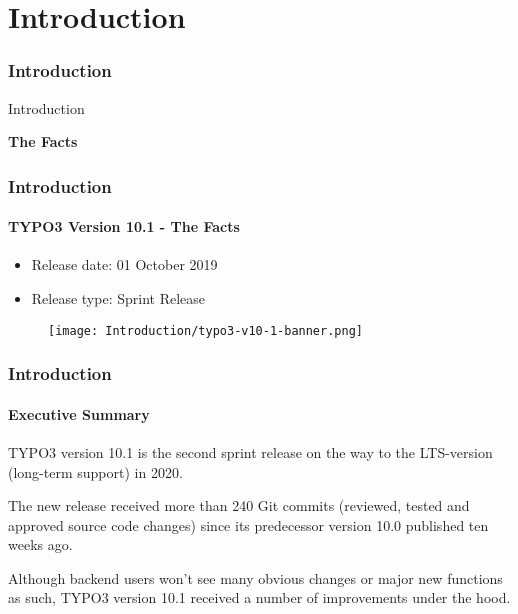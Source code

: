%

\section{Introduction}
\begin{frame}[fragile]
	\frametitle{Introduction}

	\begin{center}\huge{Introduction}\end{center}
	\begin{center}\huge{\color{typo3darkgrey}\textbf{The Facts}}\end{center}

\end{frame}


\begin{frame}[fragile]
	\frametitle{Introduction}
	\framesubtitle{TYPO3 Version 10.1 - The Facts}

	\begin{itemize}
		\item Release date: 01 October 2019
		\item Release type: Sprint Release
	\end{itemize}

	\begin{figure}
		\texttt{[image: Introduction/typo3-v10-1-banner.png]}
	\end{figure}

\end{frame}


\begin{frame}[fragile]
	\frametitle{Introduction}
	\framesubtitle{Executive Summary}

	\small
		TYPO3 version 10.1 is the second sprint release on the way to the LTS-version
		(long-term support) in 2020.

		\vspace{0.2cm}

		The new release received more than 240 Git commits (reviewed, tested and
		approved source code changes) since its predecessor version 10.0 published
		ten weeks ago.

		\vspace{0.2cm}

		Although backend users won't see many obvious changes or major new functions
		as such, TYPO3 version 10.1 received a number of improvements under the hood.

	\normalsize

\end{frame}

